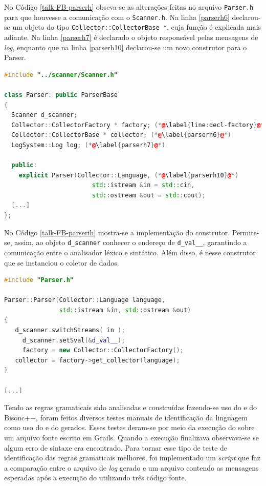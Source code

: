 No Código \ref{talk-FB-parserh} obseva-se as alterações feitas no arquivo
\lstinline|Parser.h| para que houvesse a comunicação com o \lstinline|Scanner.h|.
Na linha \ref{parserh6} declarou-se um objeto do tipo
\lstinline|Collector::CollectorBase *|, cuja função é explicada mais adiante.
Na linha \ref{parserh7} é declarado o objeto responsável pelas mensagens de
\textit{log}, enquanto que na linha \ref{parserh10} declarou-se um novo
construtor para o Parser.
\begin{lstlisting}[language=C++, label=talk-FB-parserh, caption=Alterações no Parser.h para comunicação entre Analisador Léxico e Sintático]
#include "../scanner/Scanner.h"

class Parser: public ParserBase
{
  Scanner d_scanner;
  Collector::CollectorFactory * factory; (*@\label{line:decl-factory}@*)
  Collector::CollectorBase * collector; (*@\label{parserh6}@*)
  LogSystem::Log log; (*@\label{parserh7}@*)

  public:
    explicit Parser(Collector::Language, (*@\label{parserh10}@*)
    					std::istream &in = std::cin,
    					std::ostream &out = std::cout);
  [...]
};
\end{lstlisting}

No Código \ref{talk-FB-parserih} mostra-se a implementação do construtor.
Permite-se, assim, ao objeto \lstinline|d_scanner| conhecer o endereço
de \lstinline|d_val__|, garantindo a comunicação entre o analisador léxico e
sintático. Além disso, é nesse construtor que se instanciou o coletor de
dados.
\begin{lstlisting}[language=C++, label=talk-FB-parserih, caption=Alterações no Parser.ih para comunicação entre Analisador Léxico e Sintático]
#include "Parser.h"

Parser::Parser(Collector::Language language,
			   std::istream &in, std::ostream &out)
{
   d_scanner.switchStreams( in );
	 d_scanner.setSval(&d_val__);
	 factory = new Collector::CollectorFactory();
   collector = factory->get_collector(language);
}

[...]
\end{lstlisting}

Tendo as regras gramaticais sido analisadas e construídas fazendo-se uso
do \flexcpp e do \textsf{Bisonc++}, foram feitos diversos testes manuais
de identificação da linguagem \grails como uso do \parser e do \scanner
gerados. Esses testes deram-se por meio da execução do \parser sobre um
arquivo fonte escrito em \textsf{Grails}. Quando a execução finalizava
observava-se se algum erro de sintaxe era encontrado. Para tornar esse
tipo de teste de identificação das regras gramaticais melhores, foi
implementado um \textit{script} que faz a comparação entre o arquivo de
\textit{log} gerado e um arquivo contendo as mensagens esperadas após
a execução do \parser utilizando três código fonte.

